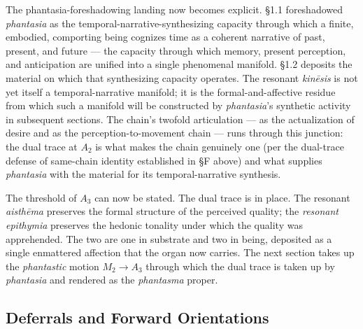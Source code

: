 The phantasia-foreshadowing landing now becomes explicit. §1.1 foreshadowed \textit{phantasia} as the temporal-narrative-synthesizing capacity through which a finite, embodied, comporting being cognizes time as a coherent narrative of past, present, and future --- the capacity through which memory, present perception, and anticipation are unified into a single phenomenal manifold. §1.2 deposits the material on which that synthesizing capacity operates. The resonant \textit{kinēsis} is not yet itself a temporal-narrative manifold; it is the formal-and-affective residue from which such a manifold will be constructed by \textit{phantasia}'s synthetic activity in subsequent sections. The chain's twofold articulation --- as the actualization of desire and as the perception-to-movement chain --- runs through this junction: the dual trace at $A_2$ is what makes the chain genuinely one (per the dual-trace defense of same-chain identity established in §F above) and what supplies \textit{phantasia} with the material for its temporal-narrative synthesis.

The threshold of $A_3$ can now be stated. The dual trace is in place. The resonant \textit{aisthēma} preserves the formal structure of the perceived quality; the \textit{resonant epithymia} preserves the hedonic tonality under which the quality was apprehended. The two are one in substrate and two in being, deposited as a single enmattered affection that the organ now carries. The next section takes up the \textit{phantastic} motion $M_2 \rightarrow A_3$ through which the dual trace is taken up by \textit{phantasia} and rendered as the \textit{phantasma} proper.

\subsection*{Deferrals and Forward Orientations}

